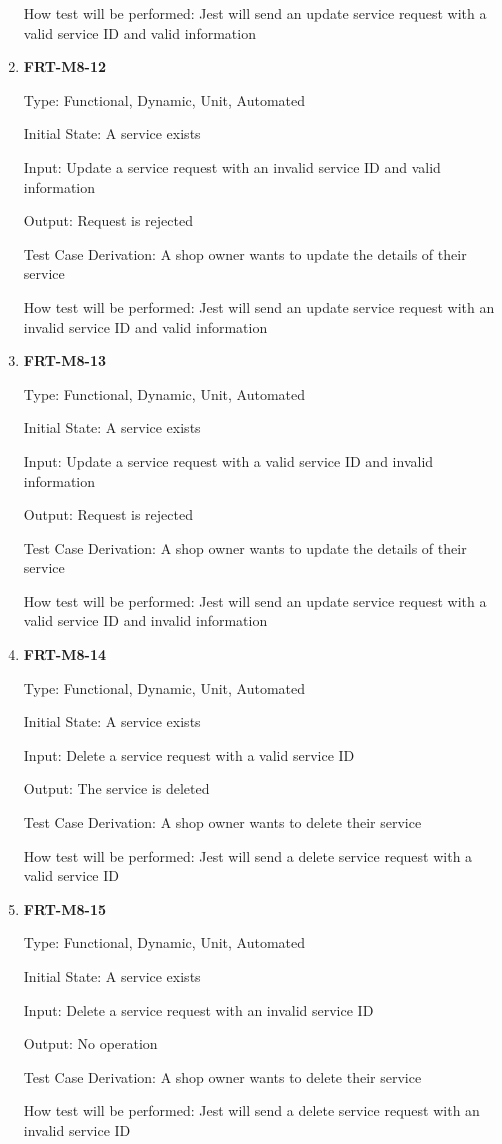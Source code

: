 \documentclass[12pt, titlepage]{article}
\begin{document}
\begin{enumerate}
	      How test will be performed: Jest will send an update service request with a valid service ID and
	      valid information

	\item \textbf{FRT-M8-12}

	      Type: Functional, Dynamic, Unit, Automated

	      Initial State: A service exists

	      Input: Update a service request with an invalid service ID and valid information

	      Output: Request is rejected

	      Test Case Derivation: A shop owner wants to update the details of their service

	      How test will be performed: Jest will send an update service request with an invalid service ID and
	      valid information

	\item \textbf{FRT-M8-13}

	      Type: Functional, Dynamic, Unit, Automated

	      Initial State: A service exists

	      Input: Update a service request with a valid service ID and invalid information

	      Output: Request is rejected

	      Test Case Derivation: A shop owner wants to update the details of their service

	      How test will be performed: Jest will send an update service request with a valid service ID and
	      invalid information

	\item \textbf{FRT-M8-14}

	      Type: Functional, Dynamic, Unit, Automated

	      Initial State: A service exists

	      Input: Delete a service request with a valid service ID

	      Output: The service is deleted

	      Test Case Derivation: A shop owner wants to delete their service

	      How test will be performed: Jest will send a delete service request with a valid service ID

	\item \textbf{FRT-M8-15}

	      Type: Functional, Dynamic, Unit, Automated

	      Initial State: A service exists

	      Input: Delete a service request with an invalid service ID

	      Output: No operation

	      Test Case Derivation: A shop owner wants to delete their service

	      How test will be performed: Jest will send a delete service request with an invalid service ID

\end{enumerate}
\end{document}
